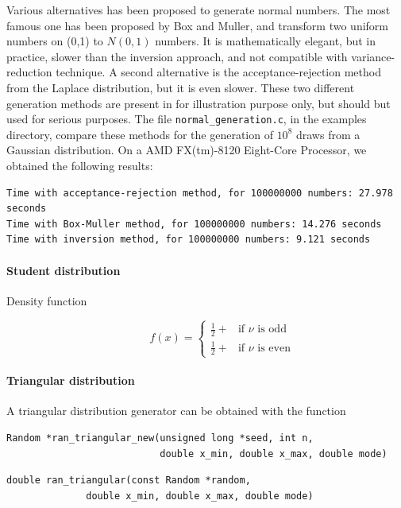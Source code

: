 Various alternatives has been proposed to generate normal numbers.
The most famous one has been proposed by Box and Muller, and transform two uniform numbers on (0,1) to $N(0,1)$ numbers.
It is mathematically elegant, but in practice, slower than the inversion approach, and not compatible with variance-reduction technique.
A second alternative is the acceptance-rejection method from the Laplace distribution, but it is even slower.
These two different generation methods are present in \oratio{} for illustration purpose only, but should but used for serious purposes.
The file \verb|normal_generation.c|, in the examples directory, compare these methods for the generation of $10^8$ draws from a Gaussian distribution.
On a AMD FX(tm)-8120 Eight-Core Processor, we obtained the following results:
\begin{verbatim}
Time with acceptance-rejection method, for 100000000 numbers: 27.978 seconds
Time with Box-Muller method, for 100000000 numbers: 14.276 seconds
Time with inversion method, for 100000000 numbers: 9.121 seconds
\end{verbatim}

\paragraph{Student distribution}

\begin{description}
\item[Density function]
\[
f(x) =
\begin{cases}
\frac{1}{2} + & \mbox{if $\nu$ is odd} \\
\frac{1}{2} + & \mbox{if $\nu$ is even} 
\end{cases}
\]
\end{description}

\paragraph{Triangular distribution}

A triangular distribution generator can be obtained with the function
\begin{verbatim}
Random *ran_triangular_new(unsigned long *seed, int n,
                           double x_min, double x_max, double mode)
\end{verbatim}

\begin{verbatim}
double ran_triangular(const Random *random,
		      double x_min, double x_max, double mode)
\end{verbatim}

